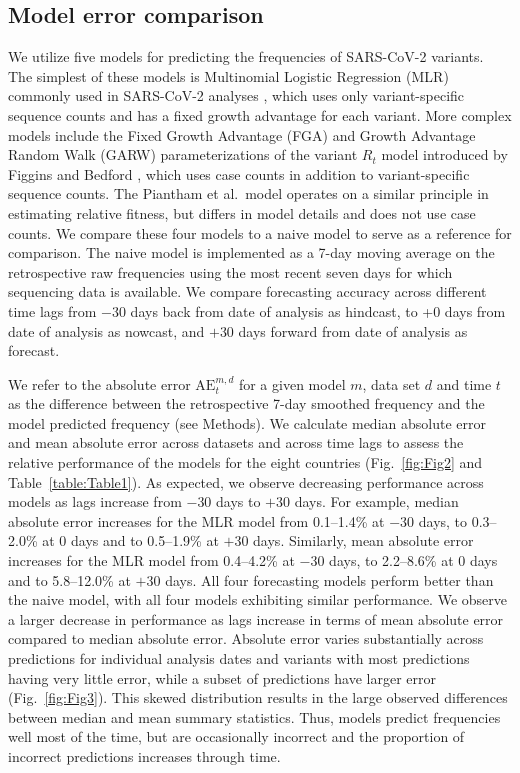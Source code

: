 \subsection*{Model error comparison}


We utilize five models for predicting the frequencies of SARS-CoV-2 variants.
The simplest of these models is Multinomial Logistic Regression (MLR) commonly used in SARS-CoV-2 analyses \cite{Annavajhala2021, faria2021genomics, obermeyer2022analysis, susswein2023early}, which uses only variant-specific sequence counts and has a fixed growth advantage for each variant.
More complex models include the Fixed Growth Advantage (FGA) and Growth Advantage Random Walk (GARW) parameterizations of the variant $R_t$ model introduced by Figgins and Bedford \cite{Figgins2021}, which uses case counts in addition to variant-specific sequence counts.
The Piantham et al.\ model \cite{piantham2021estimating} operates on a similar principle in estimating relative fitness, but differs in model details and does not use case counts.
We compare these four models to a naive model to serve as a reference for comparison.
The naive model is implemented as a 7-day moving average on the retrospective raw frequencies using the most recent seven days for which sequencing data is available.
We compare forecasting accuracy across different time lags from $-30$ days back from date of analysis as hindcast, to +0 days from date of analysis as nowcast, and $+30$ days forward from date of analysis as forecast.


We refer to the absolute error $\mathrm{AE}_{t}^{m,d}$ for a given model $m$, data set $d$ and time $t$ as the difference between the retrospective 7-day smoothed frequency and the model predicted frequency (see Methods).
We calculate median absolute error and mean absolute error across datasets and across time lags to assess the relative performance of the models for the eight countries (Fig.~\ref{fig:Fig2} and Table~\ref{table:Table1}).
As expected, we observe decreasing performance across models as lags increase from $-30$ days to $+30$ days.
For example, median absolute error increases for the MLR model from 0.1--1.4\% at $-30$ days, to 0.3--2.0\% at 0 days and to 0.5--1.9\% at $+30$ days.
Similarly, mean absolute error increases for the MLR model from 0.4--4.2\% at $-30$ days, to 2.2--8.6\% at 0 days and to 5.8--12.0\% at $+30$ days.
All four forecasting models perform better than the naive model, with all four models exhibiting similar performance.
We observe a larger decrease in performance as lags increase in terms of mean absolute error compared to median absolute error.
Absolute error varies substantially across predictions for individual analysis dates and variants with most predictions having very little error, while a subset of predictions have larger error (Fig.~\ref{fig:Fig3}).
This skewed distribution results in the large observed differences between median and mean summary statistics.
Thus, models predict frequencies well most of the time, but are occasionally incorrect and the proportion of incorrect predictions increases through time.

